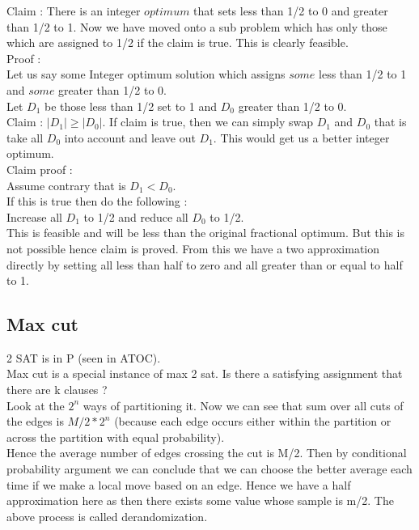 \documentclass[solution,addpoints,12pt]{exam}
\begin{document}
Claim : There is an integer $optimum$ that sets
less than 1/2 to 0 and greater than 1/2 to 1.
Now we have moved onto a sub problem which has only those which
are assigned to 1/2 if the claim is true. This is clearly feasible.\\

Proof :\\
Let us say some Integer optimum solution which assigns
$some$ less than 1/2 to 1 and $some$ greater than 1/2 to 0.\\
Let $D_1$ be those less than 1/2 set to 1 and $D_0$ greater than
1/2 to 0.\\
Claim : $|D_1| \ge |D_0|$. If claim is true, then we can simply
swap $D_1$ and $D_0$ that is take all $D_0$ into account and
leave out $D_1$. This would get us a better integer optimum.\\

Claim proof :\\
Assume contrary that is $D_1 < D_0$.\\
If this is true then do the following :\\
Increase all $D_1$ to 1/2 and reduce all $D_0$ to 1/2.\\
This is feasible and will be less than the original fractional
optimum. But this is not possible hence claim is proved.
From this we have a two approximation directly by setting all less
than half to zero and all greater than or equal to half to 1.\\

\subsection{Max cut}
2 SAT is in P (seen in ATOC).\\
Max cut is a special instance of max 2 sat. Is there a satisfying assignment that there are
k clauses ?\\

Look at the $2^n$ ways of partitioning it. Now we can see that
sum over all cuts of the edges is $M/2*2^{n}$ (because each
edge occurs either within the partition or across the partition with
equal probability).\\

Hence the average number of edges crossing the cut is M/2. Then
by conditional probability argument we can conclude that we can
choose the better average each time if we make a local move based on
an edge. Hence we have a half approximation here as then there exists
some value whose sample is m/2. The above process is called
derandomization.\\
\end{document}
